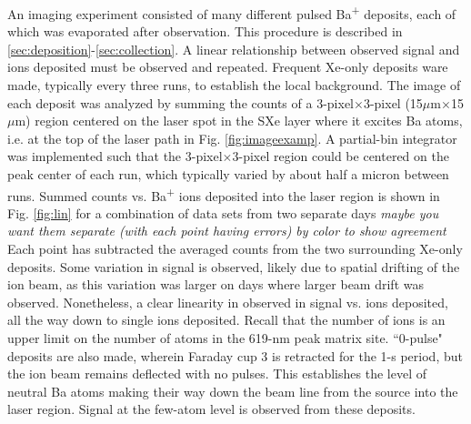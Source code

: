 An imaging experiment consisted of many different pulsed Ba\textsuperscript{+} deposits, each of which was evaporated after observation.  This procedure is described in \ref{sec:deposition}-\ref{sec:collection}.  A linear relationship between observed signal and ions deposited must be observed and repeated.  Frequent Xe-only deposits ware made, typically every three runs, to establish the local background.  The image of each deposit was analyzed by summing the counts of a 3-pixel$\times$3-pixel (15$\mu$m$\times$15$\mu$m) region centered on the laser spot in the SXe layer where it excites Ba atoms, i.e. at the top of the laser path in Fig. \ref{fig:imageexamp}.  A partial-bin integrator was implemented such that the 3-pixel$\times$3-pixel region could be centered on the peak center of each run, which typically varied by about half a micron between runs.  Summed counts vs. Ba\textsuperscript{+} ions deposited into the laser region is shown in Fig. \ref{fig:lin} for a combination of data sets from two separate days \emph{\color{blue}maybe you want them separate (with each point having errors) by color to show agreement }  Each point has subtracted the averaged counts from the two surrounding Xe-only deposits.  Some variation in signal is observed, likely due to spatial drifting of the ion beam, as this variation was larger on days where larger beam drift was observed.  Nonetheless, a clear linearity in observed in signal vs. ions deposited, all the way down to single ions deposited.  Recall that the number of ions is an upper limit on the number of atoms in the 619-nm peak matrix site.  ``0-pulse" deposits are also made, wherein Faraday cup 3 is retracted for the 1-s period, but the ion beam remains deflected with no pulses.  This establishes the level of neutral Ba atoms making their way down the beam line from the source into the laser region.  Signal at the few-atom level is observed from these deposits.


